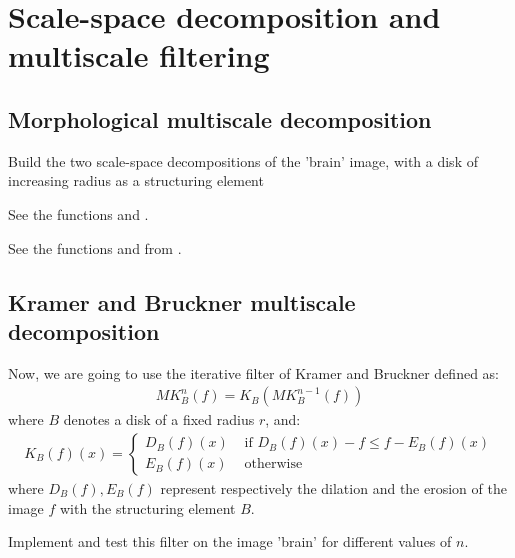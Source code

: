 \section{Scale-space decomposition and mul\-ti\-scale fil\-te\-ring}


\subsection{Morphological multiscale  decomposition}
\begin{qbox}
Build the two scale-space decompositions of the 'brain' image, with a disk of increasing radius as a structuring element
\end{qbox}

\begin{mcomment}
\begin{mremark}See the \matlabregistered{} functions  and .
\end{mremark}
\end{mcomment}

\begin{phelp}
See the functions  and  from .
\end{phelp}


\subsection{Kramer and Bruckner multiscale decomposition} Now, we are going to use the iterative filter of Kramer and Bruckner \cite{Kramer1975} defined as:
\begin{eqnarray}
		MK_B^n(f)=K_{B}(MK_B^{n-1}(f))
\end{eqnarray}
where $B$ denotes a disk of a fixed radius $r$, and:
\begin{eqnarray}
	K_B(f)(x)=\left\{\begin{array}{ll}
	D_B(f)(x)&\text{ if }D_B(f)(x)-f\leq f-E_B(f)(x)\\
	E_B(f)(x) &\text{ otherwise}
	\end{array}\right.
\end{eqnarray}
where $D_B(f), E_B(f)$ represent respectively the dilation and the erosion of the image $f$ with the structuring element $B$.

\begin{qbox}Implement and test this filter on the image 'brain' for different values of $n$.
\end{qbox}



